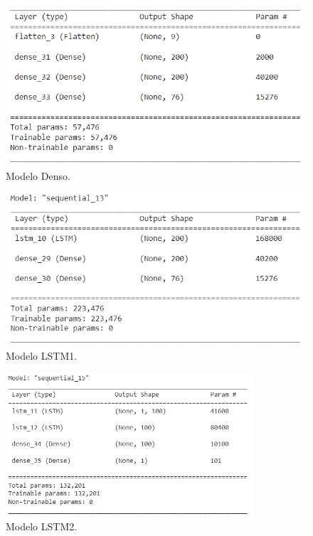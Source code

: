 \begin{figure}[h!]
    \begin{center}
      \includegraphics[height=2.in]{Figures/Red_densa.PNG}
      \caption{ Modelo Denso.}
      \label{Red_densa}
    \end{center}
  \end{figure}


  \begin{figure}[h!]
      \begin{center}
        \includegraphics[height=2.in]{Figures/Red_LSTM.PNG}
        \caption{ Modelo LSTM1.}
        \label{Red_LSTM1}
      \end{center}
    \end{figure}
  
    \begin{figure}[h!]
        \begin{center}
          \includegraphics[height=2.1in]{Figures/Red_LSTM2.PNG}
          \caption{ Modelo LSTM2.}
          \label{Red_LSTM2}
        \end{center}
      \end{figure}
    
